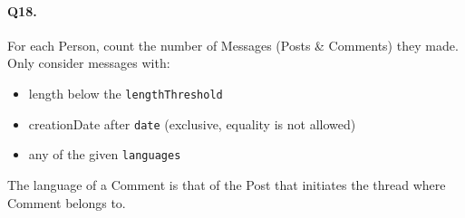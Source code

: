 \paragraph{Q18.}
For each Person, count the number of Messages (Posts \& Comments) they
made.
Only consider messages with:
\begin{itemize}
\tightlist
\item
  length below the \texttt{lengthThreshold}
\item
  creationDate after \texttt{date} (exclusive, equality is not allowed)
\item
  any of the given \texttt{languages}
\end{itemize}
The language of a Comment is that of the Post that initiates the thread
where Comment belongs to.
